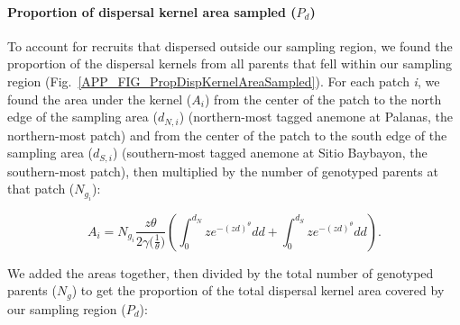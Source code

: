 \documentclass[12pt, oneside]{article}   	%
\begin{document}


\paragraph{Proportion of dispersal kernel area sampled ($P_d$)} \label{APP_SEC_PropDispKernelSampled}

To account for recruits that dispersed outside our sampling region, we found the proportion of the dispersal kernels from all parents that fell within our sampling region (Fig.\ \ref{APP_FIG_PropDispKernelAreaSampled}). For each patch \textit{i}, we found the area under the kernel ($A_i$) from the center of the patch to the north edge of the sampling area ($d_{N,i}$) (northern-most tagged anemone at Palanas, the northern-most patch) and from the center of the patch to the south edge of the sampling area ($d_{S,i}$) (southern-most tagged anemone at Sitio Baybayon, the southern-most patch), then multiplied by the number of genotyped parents at that patch ($N_{g_i}$):

\begin{equation} 
A_i = N_{g_i} \frac{z\theta}{2\gamma({\frac{1}{\theta})}} \left( \int_{0}^{d_N} z e^{-(zd)^\theta}  dd + \int_{0}^{d_S} z e^{-(zd)^\theta}  dd \right). 
\end{equation}

We added the areas together, then divided by the total number of genotyped parents ($N_g$) to get the proportion of the total dispersal kernel area covered by our sampling region ($P_d$):
\end{document}
